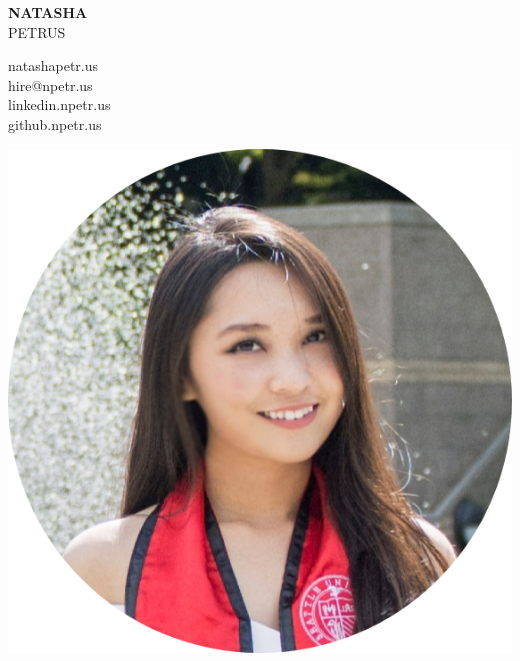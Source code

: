 \documentclass[letterpage]{article}
\begin{document}
\thispagestyle{empty} %
\begin{minipage}[]{0.4\linewidth}
\raggedright
\textbf{\fontsize{37px}{1px}\selectfont\textsf{NATASHA}}\\
\vspace{7px}
{\fontsize{37px}{1px}\selectfont\textsf{PETRUS}}
\end{minipage}
\begin{minipage}{0.01\linewidth}
\end{minipage}
\:\:\:\:\: %
\begin{minipage}{0.4\linewidth}
\raggedleft
\vspace{5px} %
natashapetr.us\enspace\faGlobe\\
hire@npetr.us\enspace\faPaperPlane\\
linkedin.npetr.us\enspace\faLinkedin\\
github.npetr.us\enspace\faGithubAlt
\end{minipage}
\begin{minipage}{0.01\linewidth}
\end{minipage}
\:\:\:\:\: %
\begin{minipage}[]{0.2\linewidth}
  \raggedright
  \includegraphics[width=0.85\linewidth]{assets/images/profile.png}
\end{minipage}
\end{document}
